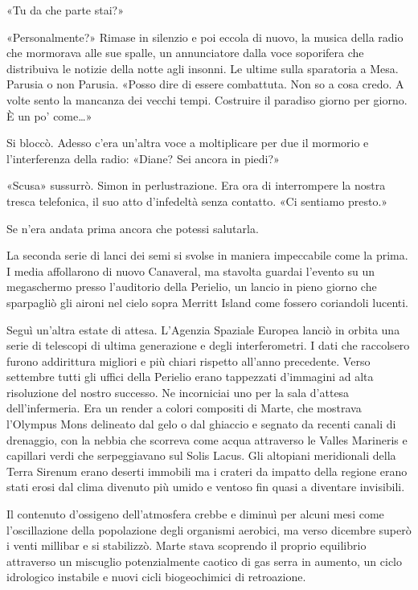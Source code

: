 «Tu da che parte stai?»

«Personalmente?» Rimase in silenzio e poi eccola di nuovo, la musica
della radio che mormorava alle sue spalle, un annunciatore dalla voce
soporifera che distribuiva le notizie della notte agli insonni. Le
ultime sulla sparatoria a Mesa. Parusia o non Parusia. «Posso dire di
essere combattuta. Non so a cosa credo. A volte sento la mancanza dei
vecchi tempi. Costruire il paradiso giorno per giorno. È un po'
come\ldots»

Si bloccò. Adesso c'era un'altra voce a moltiplicare per due il mormorio
e l'interferenza della radio: «Diane? Sei ancora in piedi?»

«Scusa» sussurrò. Simon in perlustrazione. Era ora di interrompere la
nostra tresca telefonica, il suo atto d'infedeltà senza contatto. «Ci
sentiamo presto.»

Se n'era andata prima ancora che potessi salutarla.

\separatorefiori

La seconda serie di lanci dei semi si svolse in maniera impeccabile come
la prima. I media affollarono di nuovo Canaveral, ma stavolta guardai
l'evento su un megaschermo presso l'auditorio della Perielio, un lancio
in pieno giorno che sparpagliò gli aironi nel cielo sopra Merritt Island
come fossero coriandoli lucenti.

Seguì un'altra estate di attesa. L'Agenzia Spaziale Europea lanciò in
orbita una serie di telescopi di ultima generazione e degli
interferometri. I dati che raccolsero furono addirittura migliori e più
chiari rispetto all'anno precedente. Verso settembre tutti gli uffici
della Perielio erano tappezzati d'immagini ad alta risoluzione del
nostro successo. Ne incorniciai uno per la sala d'attesa
dell'infermeria. Era un render a colori compositi di Marte, che mostrava
l'Olympus Mons delineato dal gelo o dal ghiaccio e segnato da recenti
canali di drenaggio, con la nebbia che scorreva come acqua attraverso le
Valles Marineris e capillari verdi che serpeggiavano sul Solis Lacus.
Gli altopiani meridionali della Terra Sirenum erano deserti immobili ma
i crateri da impatto della regione erano stati erosi dal clima divenuto
più umido e ventoso fin quasi a diventare invisibili.

Il contenuto d'ossigeno dell'atmosfera crebbe e diminuì per alcuni mesi
come l'oscillazione della popolazione degli organismi aerobici, ma verso
dicembre superò i venti millibar e si stabilizzò. Marte stava scoprendo
il proprio equilibrio attraverso un miscuglio potenzialmente caotico di
gas serra in aumento, un ciclo idrologico instabile e nuovi cicli
biogeochimici di retroazione.

